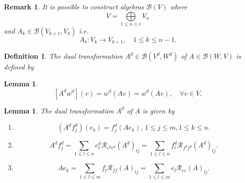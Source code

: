 \documentclass[aps,preprint]{revtex4}%
\newtheorem{definition}[theorem]{Definition}
\newtheorem{lemma}[theorem]{Lemma}
\newtheorem{remark}[theorem]{Remark}
\begin{document}
\begin{remark}
It is possible to construct \emph{algebras} $\mathcal{B}\left(  V\right)  $
where
\begin{equation}
V=%
{\displaystyle\bigoplus\limits_{1\leq n\leq r}}
V_{n}%
\end{equation}
and $A_{k}\in\mathcal{B}\left(  V_{k+1},V_{k}\right)  $ i.e.
\begin{equation}
A_{k}:V_{k}\rightarrow V_{k+1},\quad1\leq k\leq n-1.
\end{equation}

\end{remark}

\begin{definition}
The dual transformation $A^{d}\in\mathcal{B}\left(  V^{d},W^{d}\right)  $ of
$A\in\mathcal{B}\left(  W,V\right)  $ is defined by
\end{definition}

\begin{lemma}%
\begin{equation}
\left[  A^{d}w^{d}\right]  \left(  v\right)  =w^{d}\left(  Av\right)
=w^{d}\left(  Av\right)  ,\quad\forall v\in V.
\end{equation}

\end{lemma}

\begin{lemma}
The dual transformation $A^{d}$ of $A$ is given by

\begin{enumerate}
\item
\begin{equation}
\left(  A^{d}f_{j}^{d}\right)  \left(  e_{k}\right)  =f_{j}^{d}\left(
Ae_{k}\right)  ,\,1\leq j\leq m,1\leq k\leq n.
\end{equation}


\item
\begin{equation}
A^{d}f_{j}^{d}=\sum_{1\leq l\leq n}e_{l}^{d}\mathcal{R}_{e^{d}e^{d}}\left(
A^{d}\right)  _{lj}=\sum_{1\leq l\leq n}f_{l}^{d}\mathcal{R}_{f^{d}f^{d}%
}\left(  A^{d}\right)  _{lj}.
\end{equation}


\item
\begin{equation}
Ae_{k}=\sum_{1\leq l\leq m}f_{l}\mathcal{R}_{ff}\left(  A\right)  _{lj}%
=\sum_{1\leq l\leq m}e_{l}\mathcal{R}_{ee}\left(  A\right)  _{lj}.
\end{equation}

\end{enumerate}
\end{lemma}
\end{document}
